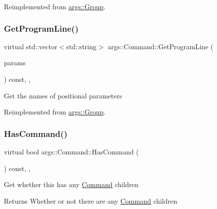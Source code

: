 Reimplemented from \hyperlink{classargs_1_1_group_ae0fa8f5ae77fda45086e7815617ddff7}{args\+::\+Group}.

\mbox{\label{classargs_1_1_command_a37fbbde216ce232279e04edce12c1245}} 
\subsubsection{\texorpdfstring{Get\+Program\+Line()}{GetProgramLine()}}
{\footnotesize\ttfamily virtual std\+::vector$<$std\+::string$>$ args\+::\+Command\+::\+Get\+Program\+Line (\begin{DoxyParamCaption}\item[{const \hyperlink{structargs_1_1_help_params}{Help\+Params} \&}]{params }\end{DoxyParamCaption}) const\hspace{0.3cm}{\ttfamily [inline]}, {\ttfamily [override]}, {\ttfamily [virtual]}}

Get the names of positional parameters 

Reimplemented from \hyperlink{classargs_1_1_group_abe9ab07499ec19e941df8f38e18089df}{args\+::\+Group}.

\mbox{\label{classargs_1_1_command_aa7117d38f553f127542434f6cafc2697}} 
\subsubsection{\texorpdfstring{Has\+Command()}{HasCommand()}}
{\footnotesize\ttfamily virtual bool args\+::\+Command\+::\+Has\+Command (\begin{DoxyParamCaption}{ }\end{DoxyParamCaption}) const\hspace{0.3cm}{\ttfamily [inline]}, {\ttfamily [override]}, {\ttfamily [virtual]}}

Get whether this has any \hyperlink{classargs_1_1_command}{Command} children

\begin{DoxyReturn}{Returns}
Whether or not there are any \hyperlink{classargs_1_1_command}{Command} children 
\end{DoxyReturn}


